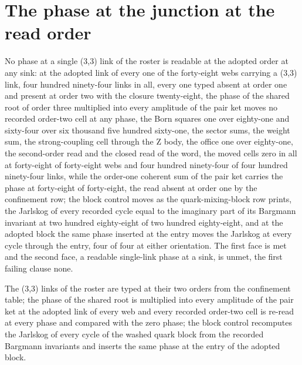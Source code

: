 \section{The phase at the junction at the read order}\label{mod:I-3-D540846-phjr-t1}
\begin{chtheorem}\label{box:I-3-D540846-phjr-t1:1}
No phase at a single (3,3) link of the roster is readable at the adopted order at any sink: at the adopted link of every one of the forty-eight webs carrying a (3,3) link, four hundred ninety-four links in all, every one typed absent at order one and present at order two with the closure twenty-eight, the phase of the shared root of order three multiplied into every amplitude of the pair ket moves no recorded order-two cell at any phase, the Born squares one over eighty-one and sixty-four over six thousand five hundred sixty-one, the sector sums, the weight sum, the strong-coupling cell through the Z body, the office one over eighty-one, the second-order read and the closed read of the word, the moved cells zero in all at forty-eight of forty-eight webs and four hundred ninety-four of four hundred ninety-four links, while the order-one coherent sum of the pair ket carries the phase at forty-eight of forty-eight, the read absent at order one by the confinement row; the block control moves as the quark-mixing-block row prints, the Jarlskog of every recorded cycle equal to the imaginary part of its Bargmann invariant at two hundred eighty-eight of two hundred eighty-eight, and at the adopted block the same phase inserted at the entry moves the Jarlskog at every cycle through the entry, four of four at either orientation. The first face is met and the second face, a readable single-link phase at a sink, is unmet, the first failing clause none.
\end{chtheorem}
The (3,3) links of the roster are typed at their two orders from the confinement table; the phase of the shared root is multiplied into every amplitude of the pair ket at the adopted link of every web and every recorded order-two cell is re-read at every phase and compared with the zero phase; the block control recomputes the Jarlskog of every cycle of the washed quark block from the recorded Bargmann invariants and inserts the same phase at the entry of the adopted block.

